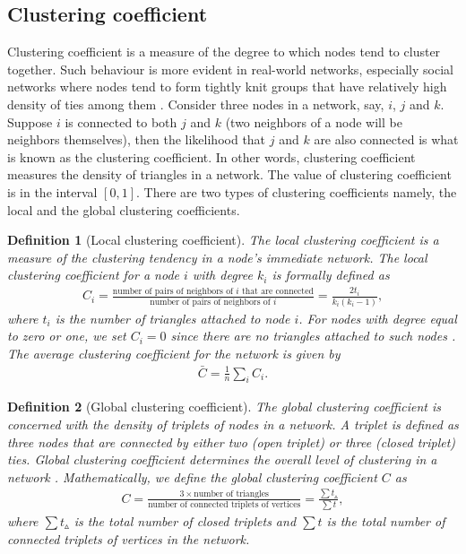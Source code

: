 \documentclass[10pt,a4paper]{article}
\newtheorem{defn}{Definition}
\begin{document}
\subsection{Clustering coefficient}
Clustering coefficient is a measure of the degree to which nodes tend to cluster together. Such behaviour is more evident in real-world networks, especially social networks where nodes tend to form tightly knit groups that have relatively high density of ties among them \citep{estrada2015first}.
Consider three nodes in a network, say, $i$, $j$ and $k$. Suppose $i$ is connected to both $j$ and $k$ (two neighbors of a node will be neighbors themselves), then the likelihood that $j$ and $k$ are also connected is what is known as the clustering coefficient. In other words, clustering coefficient measures the density of triangles in a  network. 
The value of clustering coefficient is in the interval $[0,1]$. There are two types of clustering coefficients namely, the local and the global clustering coefficients.

\begin{defn}[Local clustering coefficient]
	The local clustering coefficient is a measure of the clustering tendency in a node's immediate network. The local clustering coefficient for a node $i$ with degree $k_i$ is formally defined as 
	\begin{eqnarray}
	C_i = \frac{\text{number of pairs of neighbors of } i\text{ that are connected}}{\text{number of pairs of neighbors of }i}= \frac{2 t_i}{k_i(k_i-1)},  
	\end{eqnarray}
	where $t_i$ is the number of triangles attached to node $i$. For nodes with degree equal to zero or one, we set $C_i = 0$ since there are no triangles attached to such nodes \citep{newman2010networks}. The average clustering coefficient for the network is given by
	\begin{eqnarray}
	\bar{C} = \frac{1}{n} \sum_i C_i.
	\end{eqnarray} 
\end{defn}

\begin{defn}[Global clustering coefficient]
	The global clustering coefficient is concerned with the density of triplets of nodes in a network. A triplet is defined as three nodes that are connected by either two (open triplet) or three (closed triplet) ties. Global clustering coefficient determines the overall level of clustering in a network \citep{opsahl2009clustering}.
	Mathematically, we define the global clustering coefficient $C$ as
	\begin{eqnarray}
	C = \frac{3 \times \text{number of triangles}}{\text{number of connected triplets of vertices}} = \frac{\sum t_\vartriangle}{\sum t},
	\end{eqnarray}
	where $\sum t_\vartriangle$ is the total number of closed triplets and $\sum t$ is the total number of connected triplets of vertices in the network.
\end{defn}
\end{document}
